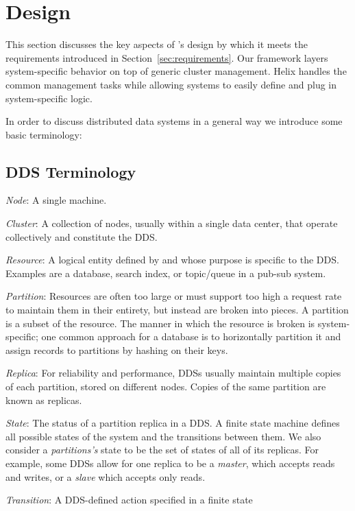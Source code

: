 \section{Design}
\label{sec:design}

This section discusses the key aspects of \helix's design by which it meets
the requirements introduced in Section~\ref{sec:requirements}.  
Our framework layers system-specific behavior on top of generic cluster
management.  Helix handles the common management tasks while allowing systems to
easily define and plug in system-specific logic.

In order to discuss distributed data systems in a general way we introduce some
basic terminology:
\subsection{DDS Terminology}
\label{terminology}
\squishlist
\item \emph{Node}: A single machine. 
\item \emph{Cluster}: A collection of nodes, usually within a single data
center, that operate collectively and
constitute the DDS.
\item \emph{Resource}: A logical entity defined by and whose purpose is specific
to the DDS.  Examples are a database, search index, or topic/queue in a pub-sub
system.
\item \emph{Partition}: Resources are often too large or must support too high a
request rate to maintain them in their entirety, but instead are broken into
pieces.  A partition is a subset of the
resource.  The manner in which the resource is broken is system-specific; one
common approach for a database is to horizontally partition it and assign records to partitions by hashing on their keys. 
\item \emph{Replica}: For reliability and performance, DDSs usually maintain
multiple copies of each partition, stored on different nodes.  Copies of the
same partition are known as replicas.
\item \emph{State}: 
The status of a partition replica in a DDS.  
A finite state machine defines all possible states of the system
and the transitions between them.  We also consider a \emph{partitions's} state
to be the set of states of all of its replicas.  For example, some DDSs allow
for one replica to be a \emph{master}, which accepts reads and writes, or a \emph{slave}
which accepts only reads.
\item \emph{Transition}: A DDS-defined action specified in a finite state
